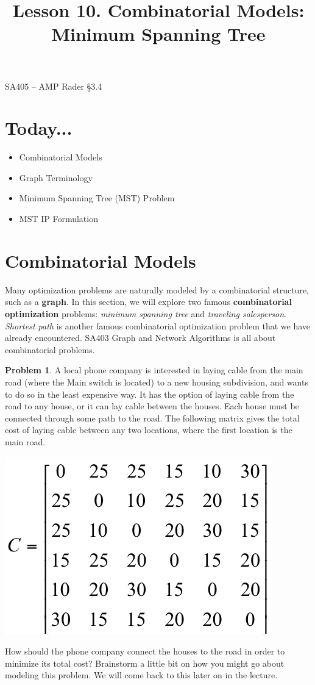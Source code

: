 \documentclass[11pt]{article}
\makeatletter
\theoremstyle{definition}
\newtheorem{problem}{Problem}
\renewcommand{\maketitle}{
  \noindent SA405 -- AMP \hfill Rader \S 3.4 \\

  \begin{center}\Large{\textbf{\@title}}\end{center}
}
\makeatother
\begin{document}
  
\title{Lesson 10.  Combinatorial Models:  Minimum Spanning Tree}

\maketitle

\section{Today...}

\begin{itemize}
	\item  Combinatorial Models
	\item  Graph Terminology
	\item  Minimum Spanning Tree (MST) Problem
	\item  MST IP Formulation
\end{itemize}

\section{Combinatorial Models}
Many optimization problems are naturally modeled by a combinatorial structure, such as a \textbf{graph}.  In this section, we will explore two famous \textbf{combinatorial optimization} problems: \emph{minimum spanning tree} and \emph{traveling salesperson}.  \emph{Shortest path} is another famous combinatorial optimization problem that we have already encountered.  SA403 Graph and Network Algorithms is all about combinatorial problems.


\begin{problem}
A local phone company is interested in laying cable from the main road (where the
Main switch is located) to a new housing subdivision, and wants to do so in the least
expensive way.  It has the option of laying cable from the road to any house, or it can 
lay cable between the houses.  Each house must be connected through some path to 
the road.  The following matrix gives the total cost of laying cable between any two
locations, where the first location is the main road.

\begin{center}
\includegraphics[width = .3\textwidth]{costs}
\end{center}

How should the phone company connect the houses to the road in order to minimize its
total cost? Brainstorm a little bit on how you might go about modeling this problem. We will come back to this later on in the lecture.
\end{problem}
\end{document}
